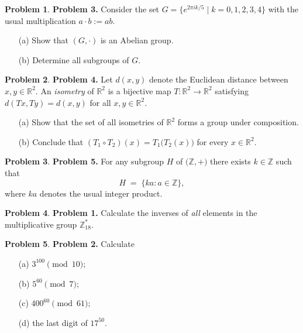 \documentclass[10pt]{article}
\theoremstyle{definition} %
\newtheorem{problem}{Problem}
\theoremstyle{plain} %
\begin{document}
  \bigskip
  \begin{problem}
  \textbf{Problem 3.}
  Consider the set
  \(G=\{e^{2\pi i k/5}\mid k=0,1,2,3,4\}\)
  with the usual multiplication \(a\cdot b:=ab\).
  \begin{enumerate}
    \item[(a)] Show that \((G,\cdot)\) is an Abelian group.
    \item[(b)] Determine all subgroups of \(G\).
  \end{enumerate}
  \end{problem}
  
  \bigskip
  \begin{problem}
  \textbf{Problem 4.}
  Let \(d(x,y)\) denote the Euclidean distance between \(x,y\in\mathbb R^{2}\).
  An \emph{isometry} of \(\mathbb R^{2}\) is a bijective map
  \(T:\mathbb R^{2}\to\mathbb R^{2}\) satisfying
  \(d(Tx,Ty)=d(x,y)\) for all \(x,y\in\mathbb R^{2}\).
  \begin{enumerate}
    \item[(a)] Show that the set of all isometries of
              \(\mathbb R^{2}\) forms a group under composition.
    \item[(b)] Conclude that
              \((T_{1}\circ T_{2})(x)=T_{1}\bigl(T_{2}(x)\bigr)\)
              for every \(x\in\mathbb R^{2}\).
  \end{enumerate}
  \end{problem}
  
  \bigskip
  \begin{problem}
  \textbf{Problem 5.}
  For any subgroup \(H\) of \(\bigl(\mathbb Z,+\bigr)\) there exists
  \(k\in\mathbb Z\) such that
  \[
      H \;=\;
      \{ka : a\in\mathbb Z\},
  \]
  where \(ka\) denotes the usual integer product.
  \end{problem}
\begin{problem}
  \textbf{Problem 1.}
  Calculate the inverses of \emph{all} elements in the multiplicative group
  \(\mathbb Z_{18}^{\ast}\).
  \end{problem}
  
  \bigskip
  \begin{problem}
  \textbf{Problem 2.}  Calculate
  \begin{enumerate}
    \item[(a)] \(3^{100}\pmod{10};\)
    \item[(b)] \(5^{60}\pmod{7};\)
    \item[(c)] \(400^{60}\pmod{61};\)
    \item[(d)] the last digit of \(17^{50}\).
  \end{enumerate}
  \end{problem}
  
\end{document}
